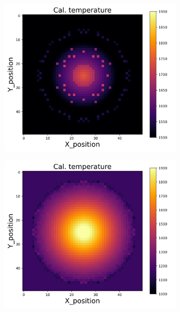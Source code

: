 {\begin{figure}[p]
\begin{minipage}{\textwidth}
\begin{subfigure}{0.325\textwidth}
        \end{subfigure}
        \begin{subfigure}{0.325\textwidth}
            \centering
            \includegraphics[width=\textwidth]{figures/raw_data/5/exp/T_cal.jpg}
        \end{subfigure}
        \begin{subfigure}{0.325\textwidth}
            \centering
            \includegraphics[width=\textwidth]{figures/raw_data/21/exp/T_cal.jpg}

\end{subfigure}
\end{minipage}
\end{figure}}
